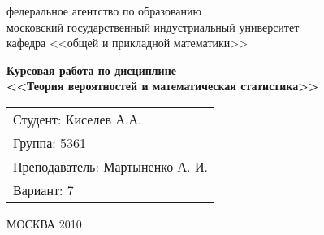 


\thispagestyle{empty}

\vspace*{-\headheight}\vspace*{-\headsep}

{\centering
{\sc
федеральное агентство по образованию\\
московский государственный индустриальный университет\\
кафедра <<общей и прикладной математики>>\\
}


\vspace{7cm plus 1mm minus 1mm}


{\large\bf
Курсовая работа по дисциплине\\
<<Теория вероятностей и математическая статистика>>
}


\vfill

\begin{flushright}
\begin{tabular}{l}
Студент: Киселев А.А.
\\
Группа: 5361
\\
Преподаватель: Мартыненко А. И.
\\
Вариант: 7
\end{tabular}
\end{flushright}

\vfill

{\small\sc 
МОСКВА 2010
}

}

\newpage
\endinput
